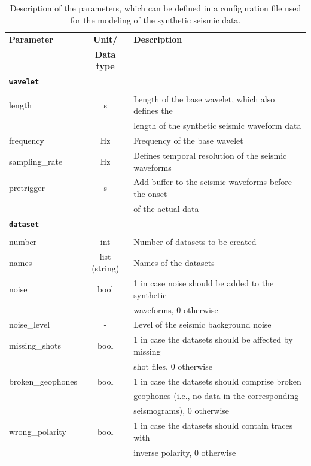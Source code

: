 \documentclass[a4paper,fleqn]{cas-sc}
\begin{document}
\begin{table}[]
    \caption{Description of the parameters, which can be defined in a configuration file used for the modeling of the synthetic seismic data.}
    \centering
    \begin{tabular*}{\tblwidth}{@{} LCL@{}}
        \toprule
        \textbf{Parameter} & \textbf{Unit/} & \textbf{Description} \\
         & \textbf{Data type} & \\ 
        \midrule
        \textbf{\texttt{wavelet}} & & \\
         & & \\
        length & s & Length of the base wavelet, which also defines the \\
         & & length of the synthetic seismic waveform data \\ 
        frequency & Hz & Frequency of the base wavelet \\ 
        sampling\_rate & Hz & Defines temporal resolution of the seismic waveforms \\ 
        pretrigger & s & Add buffer to the seismic waveforms before the onset \\
         & & of the actual data \\
        \midrule
        \textbf{\texttt{dataset}} & & \\
         & & \\
        number & int & Number of datasets to be created \\
        names & list (string) & Names of the datasets \\
        noise & bool & 1 in case noise should be added to the synthetic \\
         & & waveforms, 0 otherwise \\
        noise\_level & - & Level of the seismic background noise \\
        missing\_shots & bool & 1 in case the datasets should be affected by missing \\
         & & shot files, 0 otherwise \\
        broken\_geophones & bool & 1 in case the datasets should comprise broken \\
         & & geophones (i.e., no data in the corresponding \\
         & & seismograms), 0 otherwise \\
        wrong\_polarity & bool & 1 in case the datasets should contain traces with \\
         & & inverse polarity, 0 otherwise \\

\end{tabular*}
\end{table}
\end{document}
